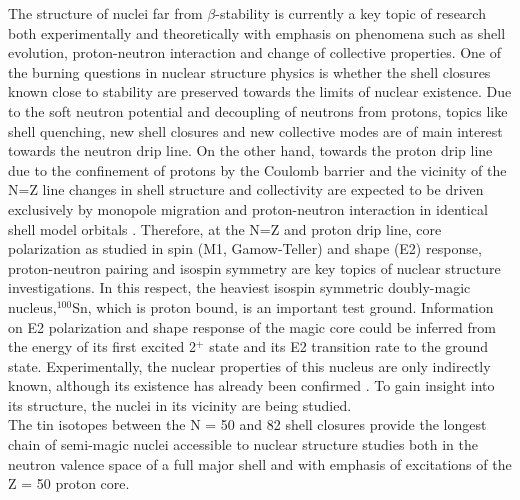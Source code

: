 \documentclass[aps,prc,twocolumn,amssymb,showpacs]{revtex4}
\begin{document}
The structure of nuclei far from $\beta$-stability is currently a
key topic of research both experimentally and theoretically with
emphasis on phenomena such as shell evolution, proton-neutron
interaction and change of collective properties. One of the
burning questions in nuclear structure physics is whether the
shell closures known close to stability are preserved towards the
limits of nuclear existence. Due to the soft neutron potential and
decoupling of neutrons from protons, topics like shell quenching,
new shell closures and new collective modes are of main interest
\cite{dob94,naz95} towards the neutron drip line. On the other
hand, towards the proton drip line due to the confinement of
protons by the Coulomb barrier and the vicinity of the N=Z line
changes in shell structure and collectivity are expected to be
driven exclusively by monopole migration \cite{ots01,gra04} and
proton-neutron interaction in identical shell model orbitals
\cite{naz95}. Therefore, at the N=Z and proton drip line, core
polarization as studied in spin (M1, Gamow-Teller) and shape (E2)
response, proton-neutron pairing and isospin symmetry are key
topics of nuclear structure investigations. In this respect, the
heaviest isospin symmetric doubly-magic nucleus,$^{100}$Sn, which
is proton bound, is an important test ground. Information on E2
polarization and shape response of the magic core could be
inferred from the energy of its first excited 2$^+$ state and its
E2 transition rate to the ground state. Experimentally, the
nuclear properties of this nucleus are only indirectly known,
although its existence has already been confirmed
\cite{lew94,sch94}. To gain insight into its structure, the nuclei
in its vicinity are being studied.\\
The tin isotopes between the N = 50 and 82 shell closures provide
the longest chain of semi-magic nuclei accessible to nuclear
structure studies both in the neutron valence space of a full
major shell and with emphasis of excitations of the Z = 50 proton core.\\
\end{document}
